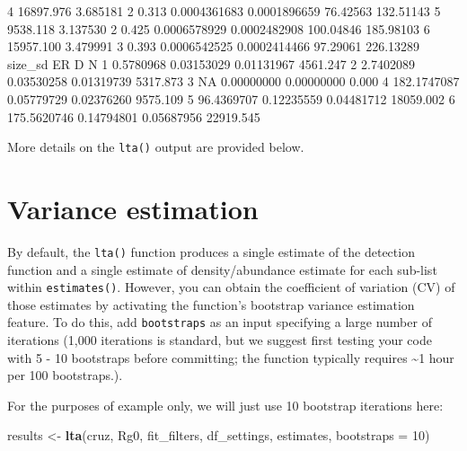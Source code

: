 \documentclass[
]{book}
\newenvironment{Shaded}{\begin{snugshade}}{\end{snugshade}}
\newcommand{\AttributeTok}[1]{\textcolor[rgb]{0.13,0.29,0.53}{#1}}
\newcommand{\ConstantTok}[1]{\textcolor[rgb]{0.56,0.35,0.01}{#1}}
\newcommand{\DecValTok}[1]{\textcolor[rgb]{0.00,0.00,0.81}{#1}}
\newcommand{\FloatTok}[1]{\textcolor[rgb]{0.00,0.00,0.81}{#1}}
\newcommand{\FunctionTok}[1]{\textcolor[rgb]{0.13,0.29,0.53}{\textbf{#1}}}
\newcommand{\NormalTok}[1]{#1}
\newcommand{\OtherTok}[1]{\textcolor[rgb]{0.56,0.35,0.01}{#1}}
\begin{document}
\begin{Shaded}
\begin{Highlighting}[]
\DecValTok{4}    \FloatTok{16897.976} \FloatTok{3.685181} \DecValTok{2}  \FloatTok{0.313} \FloatTok{0.0004361683} \FloatTok{0.0001896659}   \FloatTok{76.42563} \FloatTok{132.51143}
\DecValTok{5}     \FloatTok{9538.118} \FloatTok{3.137530} \DecValTok{2}  \FloatTok{0.425} \FloatTok{0.0006578929} \FloatTok{0.0002482908}  \FloatTok{100.04846} \FloatTok{185.98103}
\DecValTok{6}    \FloatTok{15957.100} \FloatTok{3.479991} \DecValTok{3}  \FloatTok{0.393} \FloatTok{0.0006542525} \FloatTok{0.0002414466}   \FloatTok{97.29061} \FloatTok{226.13289}
\NormalTok{      size\_sd         ER          D         N}
\DecValTok{1}   \FloatTok{0.5780968} \FloatTok{0.03153029} \FloatTok{0.01131967}  \FloatTok{4561.247}
\DecValTok{2}   \FloatTok{2.7402089} \FloatTok{0.03530258} \FloatTok{0.01319739}  \FloatTok{5317.873}
\DecValTok{3}          \ConstantTok{NA} \FloatTok{0.00000000} \FloatTok{0.00000000}     \FloatTok{0.000}
\DecValTok{4} \FloatTok{182.1747087} \FloatTok{0.05779729} \FloatTok{0.02376260}  \FloatTok{9575.109}
\DecValTok{5}  \FloatTok{96.4369707} \FloatTok{0.12235559} \FloatTok{0.04481712} \FloatTok{18059.002}
\DecValTok{6} \FloatTok{175.5620746} \FloatTok{0.14794801} \FloatTok{0.05687956} \FloatTok{22919.545}
\end{Highlighting}
\end{Shaded}

More details on the \texttt{lta()} output are provided below.

\hypertarget{variance-estimation}{%
\section*{Variance estimation}\label{variance-estimation}}

By default, the \texttt{lta()} function produces a single estimate of the detection function and a single estimate of density/abundance estimate for each sub-list within \texttt{estimates()}. However, you can obtain the coefficient of variation (CV) of those estimates by activating the function's bootstrap variance estimation feature. To do this, add \texttt{bootstraps} as an input specifying a large number of iterations (1,000 iterations is standard, but we suggest first testing your code with 5 - 10 bootstraps before committing; the function typically requires \textasciitilde1 hour per 100 bootstraps.).

For the purposes of example only, we will just use 10 bootstrap iterations here:

\begin{Shaded}
\begin{Highlighting}[]
\NormalTok{results }\OtherTok{\textless{}{-}} \FunctionTok{lta}\NormalTok{(cruz, Rg0,}
\NormalTok{               fit\_filters, df\_settings, estimates,}
               \AttributeTok{bootstraps =} \DecValTok{10}\NormalTok{)}
\end{Highlighting}
\end{Shaded}
\end{document}
